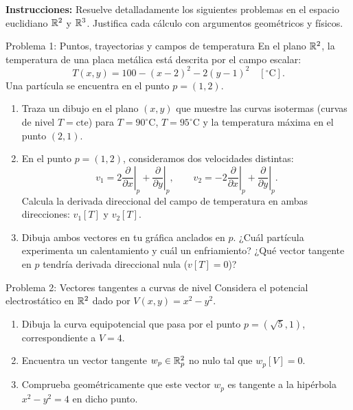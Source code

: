 \documentclass[11pt,letterpaper]{article}
\begin{document}
\setlength{\abovedisplayskip}{6pt}
\setlength{\belowdisplayskip}{6pt}
\setlength{\textfloatsep}{10pt}
\setlength{\intextsep}{8pt}
\color{blackmain}


\noindent\textbf{Instrucciones:} Resuelve detalladamente los siguientes problemas en el espacio euclidiano $\mathbb{R}^2$ y $\mathbb{R}^3$. Justifica cada cálculo con argumentos geométricos y físicos.


\begin{infobox}{Problema 1: Puntos, trayectorias y campos de temperatura}
En el plano $\mathbb{R}^2$, la temperatura de una placa metálica está descrita por el campo escalar:
\[
T(x, y) = 100 - (x - 2)^2 - 2(y - 1)^2 \quad [^\circ\text{C}].
\]
Una partícula se encuentra en el punto $p = (1, 2)$.
\begin{enumerate}[label=\alph*)]
    \item Traza un dibujo en el plano $(x, y)$ que muestre las curvas isotermas (curvas de nivel $T = \text{cte}$) para $T = 90^\circ\text{C}$, $T = 95^\circ\text{C}$ y la temperatura máxima en el punto $(2, 1)$.
    \item En el punto $p = (1, 2)$, consideramos dos velocidades distintas:
    \[
    v_1 = 2 \left.\frac{\partial}{\partial x}\right|_p + \left.\frac{\partial}{\partial y}\right|_p, \qquad
    v_2 = -2 \left.\frac{\partial}{\partial x}\right|_p + \left.\frac{\partial}{\partial y}\right|_p.
    \]
    Calcula la derivada direccional del campo de temperatura en ambas direcciones: $v_1[T]$ y $v_2[T]$.
    \item Dibuja ambos vectores en tu gráfica anclados en $p$. ¿Cuál partícula experimenta un calentamiento y cuál un enfriamiento? ¿Qué vector tangente en $p$ tendría derivada direccional nula ($v[T] = 0$)?
\end{enumerate}
\end{infobox}

\begin{infobox}{Problema 2: Vectores tangentes a curvas de nivel}
Considera el potencial electrostático en $\mathbb{R}^2$ dado por $V(x, y) = x^2 - y^2$.
\begin{enumerate}[label=\alph*)]
    \item Dibuja la curva equipotencial que pasa por el punto $p = (\sqrt{5}, 1)$, correspondiente a $V = 4$.
    \item Encuentra un vector tangente $w_p \in \mathbb{R}^2_p$ no nulo tal que $w_p[V] = 0$. 
    \item Comprueba geométricamente que este vector $w_p$ es tangente a la hipérbola $x^2 - y^2 = 4$ en dicho punto.
\end{enumerate}
\end{infobox}
\end{document}
